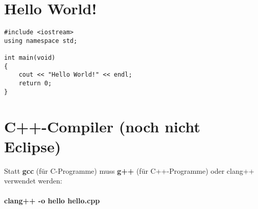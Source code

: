 \begin{multicols}{2}
\section{Hello World!}
\vspace{-\baselineskip}
\begin{minipage}{\linewidth}
\begin{lstlisting}
#include <iostream>
using namespace std;

int main(void)
{
	cout << "Hello World!" << endl;
	return 0;
}
\end{lstlisting}
\end{minipage}
\vfill\null
\columnbreak
\section{C++-Compiler (noch nicht Eclipse)}
Statt \textbf{gcc} (für C-Programme) muss \textbf{g++} (für C++-Programme) oder clang++ verwendet werden:\\

\\
\textbf{clang++ -o hello hello.cpp}
\flushleft
\vfill\null
\end{multicols}


